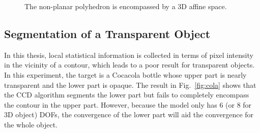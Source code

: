 \begin{figure}[htbp]
\begin{minipage}[t]{0.5\linewidth}
  \end{minipage} 
  \begin{minipage}[t]{0.5\linewidth} 
    \centering 
  \end{minipage} 
\caption[3D affine shape-space for rigid object]{The
  non-planar polyhedron is encompassed by a 3D affine space.}
\label{fig:container}
\end{figure}

\subsection{Segmentation of a Transparent Object}
\label{sec:sto}
In this thesis, local statistical information is collected in terms of
pixel intensity in the vicinity of a contour, which leads to a poor
result for transparent objects. In this experiment, the
target is a Cocacola bottle whose upper part is nearly transparent and the
lower part is opaque. The result in Fig.~\ref{fig:cola} shows that the CCD algorithm
segments the lower part but fails to completely encompass the contour in the
upper part. However, because the model only has 6 (or 8
for 3D object) DOFs, the convergence of the lower part will aid the convergence for the whole object.


